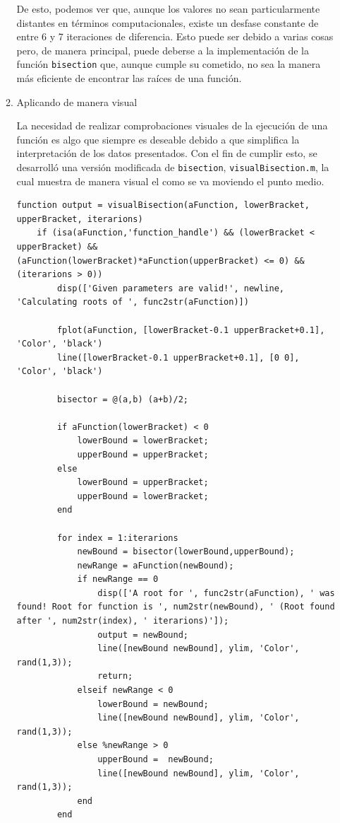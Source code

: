 \documentclass[english,notitlepage,letterpaper, 10pt]{article} %
\begin{document}
\begin{enumerate}
\begin{enumerate}
      De esto, podemos ver que, aunque los valores no sean particularmente distantes en términos computacionales, existe un desfase constante de entre 6 y 7 iteraciones de diferencia. Esto puede ser debido a varias cosas pero, de manera principal, puede deberse a la implementación de la función \texttt{bisection} que, aunque cumple su cometido, no sea la manera más eficiente de encontrar las raíces de una función.

      \item Aplicando de manera visual
      
      La necesidad de realizar comprobaciones visuales de la ejecución de una función es algo que siempre es deseable debido a que simplifica la interpretación de los datos presentados. Con el fin de cumplir esto, se desarrolló una versión modificada de \texttt{bisection}, \texttt{visualBisection.m}, la cual muestra de manera visual el como se va moviendo el punto medio.

      \begin{lstlisting}
function output = visualBisection(aFunction, lowerBracket, upperBracket, iterarions)
    if (isa(aFunction,'function_handle') && (lowerBracket < upperBracket) && (aFunction(lowerBracket)*aFunction(upperBracket) <= 0) && (iterarions > 0))
        disp(['Given parameters are valid!', newline, 'Calculating roots of ', func2str(aFunction)])

        fplot(aFunction, [lowerBracket-0.1 upperBracket+0.1], 'Color', 'black')
        line([lowerBracket-0.1 upperBracket+0.1], [0 0], 'Color', 'black')
        
        bisector = @(a,b) (a+b)/2;
        
        if aFunction(lowerBracket) < 0
            lowerBound = lowerBracket;
            upperBound = upperBracket;
        else
            lowerBound = upperBracket;
            upperBound = lowerBracket;
        end
        
        for index = 1:iterarions
            newBound = bisector(lowerBound,upperBound);
            newRange = aFunction(newBound);
            if newRange == 0
                disp(['A root for ', func2str(aFunction), ' was found! Root for function is ', num2str(newBound), ' (Root found after ', num2str(index), ' iterarions)']);
                output = newBound;
                line([newBound newBound], ylim, 'Color', rand(1,3));
                return;
            elseif newRange < 0
                lowerBound = newBound;
                line([newBound newBound], ylim, 'Color', rand(1,3));
            else %newRange > 0
                upperBound =  newBound;
                line([newBound newBound], ylim, 'Color', rand(1,3));
            end
        end


\end{lstlisting}
\end{enumerate}
\end{enumerate}
\end{document}
